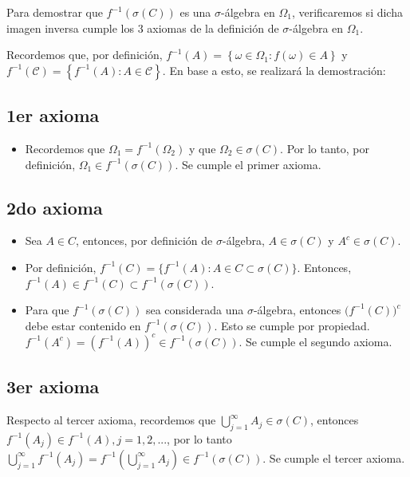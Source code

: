 \documentclass[11pt]{article}
\begin{document}
Para demostrar que $\mathit{f}^{-1}(\sigma(C))$ es una $\sigma$-álgebra en $\Omega_{1}$, verificaremos si dicha imagen inversa cumple los 3 axiomas de la definición de $\sigma$-álgebra en $\Omega_{1}$. 

Recordemos que, por definición,  $f^{-1}(A)=\left\{\omega \in \Omega_{1} : f(\omega) \in A\right\}$ y $f^{-1}(\mathcal{C})=\left\{f^{-1}(A) : A \in \mathcal{C}\right\}$. En base a esto, se realizará la demostración:

\subsection{1er axioma}

\begin{itemize}
	\item Recordemos que $\Omega_{1} = \mathit{f}^{-1}(\Omega_{2})$ y que $\Omega_{2} \in \sigma(C)$. Por lo tanto, por definición, $\Omega_{1} \in \mathit{f}^{-1}(\sigma(C))$. Se cumple el primer axioma.
\end{itemize}

\subsection{2do axioma}

\begin{itemize}
	\item Sea $ A \in C$, entonces, por definición de $\sigma$-álgebra, $\mathit{A} \in \sigma(C)$ y $\mathit{A}^{c} \in \sigma(C)$.
	\item Por definición, $\mathit{f}^{-1} (C) = \{\mathit{f}^{-1} (A): A \in C \subset \sigma(C) \}$. Entonces, $\mathit{f}^{-1}(A) \in \mathit{f}^{-1}(C) \subset \mathit{f}^{-1}(\sigma(C))$.
	\item Para que  $\mathit{f}^{-1}(\sigma(C))$ sea considerada una $\sigma$-álgebra, entonces $\mathit{(f}^{-1}(C))^{c}$ debe estar contenido en $\mathit{f}^{-1}(\sigma(C))$. Esto se cumple por propiedad. $\mathit{f}^{-1}(A^{c}) = (\mathit{f}^{-1}(A))^{c} \in \mathit{f}^{-1}(\sigma(C))$. Se cumple el segundo axioma.
\end{itemize}

\subsection{3er axioma}

Respecto al tercer axioma, recordemos que $\bigcup^{\infty}_{j=1} A_{j} \in \sigma(C)$, entonces $\mathit{f}^{-1}(A_{j}) \in \mathit{f}^{-1}(A), j=1,2, ... $, por lo tanto  $\bigcup_{j=1}^{\infty} \mathit{f}^{-1}(A_j) = \mathit{f}^{-1}(\bigcup_{j=1}^{\infty}A_j) \in \mathit{f}^{-1}(\sigma(C))$. Se cumple el tercer axioma.
\end{document}
